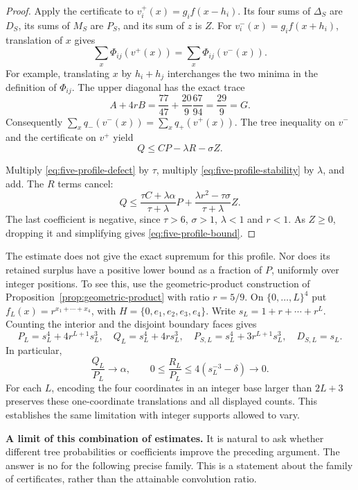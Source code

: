 \begin{proof}
Apply the certificate to
$v_i^+(x)=g_i f(x-h_i)$.  Its four sums of $\Delta_S$ are $D_S$,
its sums of $M_S$ are $P_S$, and its sum of $z$ is $Z$.
For $v_i^-(x)=g_i f(x+h_i)$, translation of $x$ gives
\[
 \sum_x\Phi_{ij}(v^+(x))=\sum_x\Phi_{ij}(v^-(x)).
\]
For example, translating $x$ by $h_i+h_j$ interchanges the two
minima in the definition of $\Phi_{ij}$.  The upper diagonal has
the exact trace
\[
 A+4rB=\frac{77}{47}+\frac{20}{9}\frac{67}{94}
       =\frac{29}{9}=G.
\]
Consequently
$\sum_xq_-(v^-(x))=\sum_xq_+(v^+(x))$.
The tree inequality on $v^-$ and the certificate on $v^+$ yield
\begin{equation}\label{eq:five-profile-defect}
 Q\le C P-\lambda R-\sigma Z.
\end{equation}

Multiply \eqref{eq:five-profile-defect} by $\tau$, multiply
\eqref{eq:five-profile-stability} by $\lambda$, and add.
The $R$ terms cancel:
\[
 Q\le
 \frac{\tau C+\lambda\alpha}{\tau+\lambda}P
 +\frac{\lambda r^2-\tau\sigma}{\tau+\lambda}Z.
\]
The last coefficient is negative, since $\tau>6$, $\sigma>1$,
$\lambda<1$ and $r<1$.  As $Z\ge0$, dropping it and simplifying
gives \eqref{eq:five-profile-bound}.
\end{proof}

The estimate does not give the exact supremum for this profile.
Nor does its retained surplus have a positive lower bound as a
fraction of $P$, uniformly over integer positions.  To see this,
use the geometric-product construction of
Proposition~\ref{prop:geometric-product} with ratio $r=5/9$.
On $\{0,\ldots,L\}^4$ put
$f_L(x)=r^{x_1+\cdots+x_4}$, with $H=\{0,e_1,e_2,e_3,e_4\}$.
Write $s_L=1+r+\cdots+r^L$.  Counting the interior and the disjoint
boundary faces gives
\[
 P_L=s_L^4+4r^{L+1}s_L^3,\quad
 Q_L=s_L^4+4rs_L^3,\quad
 P_{S,L}=s_L^4+3r^{L+1}s_L^3,\quad D_{S,L}=s_L.
\]
In particular,
\[
 \frac{Q_L}{P_L}\longrightarrow\alpha,\qquad
 0\le\frac{R_L}{P_L}
 \le4(s_L^{-3}-\delta)\longrightarrow0.
\]
For each $L$, encoding the four coordinates in an integer base
larger than $2L+3$ preserves these one-coordinate translations and
all displayed counts.  This establishes the same limitation with
integer supports allowed to vary.

\medskip\noindent\textbf{A limit of this combination of estimates.}
It is natural to ask whether different tree probabilities or
coefficients improve the preceding argument.  The answer is no
for the following precise family.  This is a statement about the
family of certificates, rather than the attainable convolution ratio.

